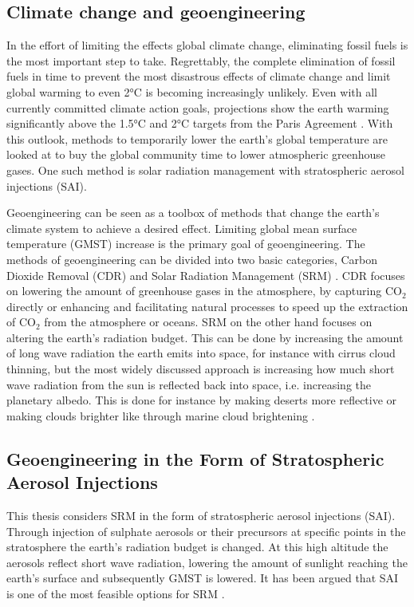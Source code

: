 \subsection{Climate change and geoengineering}
In the effort of limiting the effects global climate change, eliminating fossil fuels is the most important step to take. Regrettably, the complete elimination of fossil fuels in time to prevent the most disastrous effects of climate change and limit global warming to even 2°C is becoming increasingly unlikely. Even with all currently committed climate action goals, projections show the earth warming significantly above the 1.5°C and 2°C targets from the Paris Agreement \parencite{NDCsynth}. With this outlook, methods to temporarily lower the earth's global temperature are looked at to buy the global community time to lower atmospheric greenhouse gases. One such method is solar radiation management with stratospheric aerosol injections (SAI). 

Geoengineering can be seen as a toolbox of methods that change the earth's climate system to achieve a desired effect. Limiting global mean surface temperature (GMST) increase is the primary goal of geoengineering. The methods of geoengineering can be divided into two basic categories, Carbon Dioxide Removal (CDR) and Solar Radiation Management (SRM) \parencite{shepherd2009}. CDR focuses on lowering the amount of greenhouse gases in the atmosphere, by capturing CO$_2$ directly or enhancing and facilitating natural processes to speed up the extraction of CO$_2$ from the atmosphere or oceans. SRM on the other hand focuses on altering the earth's radiation budget. This can be done by increasing the amount of long wave radiation the earth emits into space, for instance with cirrus cloud thinning, but the most widely discussed approach is increasing how much short wave radiation from the sun is reflected back into space, i.e. increasing the planetary albedo. This is done for instance by making deserts more reflective or making clouds brighter like through marine cloud brightening \parencite{reflecting}. 

\subsection{Geoengineering in the Form of Stratospheric Aerosol Injections}
This thesis considers SRM in the form of stratospheric aerosol injections (SAI). Through injection of sulphate aerosols or their precursors at specific points in the stratosphere the earth's radiation budget is changed. At this high altitude the aerosols reflect short wave radiation, lowering the amount of sunlight reaching the earth's surface and subsequently GMST is lowered. It has been argued that SAI is one of the most feasible options for SRM \parencite{lenton2009,shepherd2009}.

